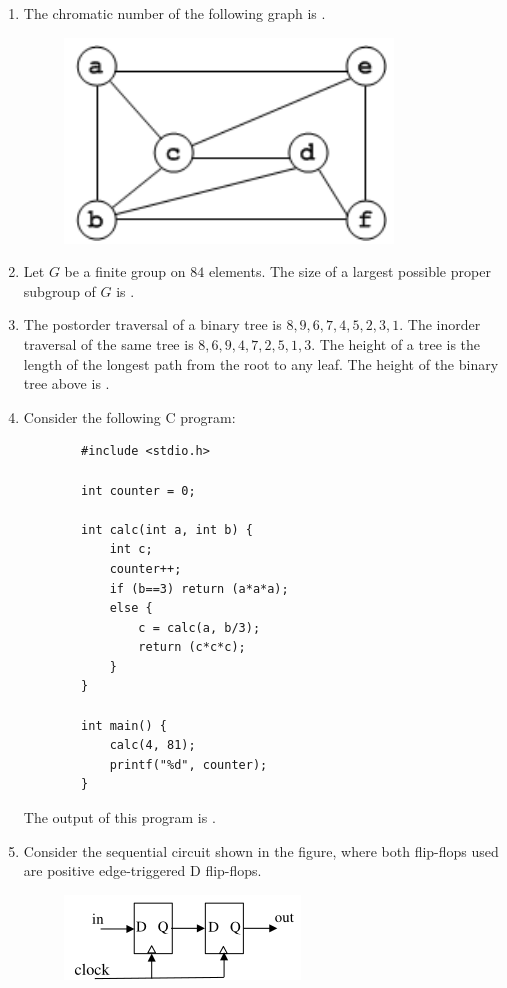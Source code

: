 \documentclass[journal,12pt,onecolumn]{IEEEtran}
\theoremstyle{remark}
\begin{document}
\begin{enumerate}
	\item The chromatic number of the following graph is \underline{\hspace{2cm}}. 
	\hfill{}
	\begin{figure}[H]
		\centering
		\includegraphics[width=0.4\linewidth]{figs/screenshot003}
		\caption{}
		\label{fig:screenshot003}
	\end{figure}
	\item Let $G$ be a finite group on $84$ elements. The size of a largest possible proper subgroup of $G$ is \underline{\hspace{2cm}}.
	
	\hfill{}
	
	\item The postorder traversal of a binary tree is $8,9,6,7,4,5,2,3,1$. The inorder traversal of the same tree is $8,6,9,4,7,2,5,1,3$. The height of a tree is the length of the longest path from the root to any leaf. The height of the binary tree above is \underline{\hspace{2cm}}.
	
	\hfill{}
	
	\item Consider the following C program:
	\begin{verbatim}
		#include <stdio.h>
		
		int counter = 0;
		
		int calc(int a, int b) {
			int c;
			counter++;
			if (b==3) return (a*a*a);
			else {
				c = calc(a, b/3);
				return (c*c*c);
			}
		}
		
		int main() {
			calc(4, 81);
			printf("%d", counter);
		}
	\end{verbatim}
	The output of this program is \underline{\hspace{2cm}}.
	
	\hfill{}
	
	\item Consider the sequential circuit shown in the figure, where both flip-flops used are positive edge-triggered D flip-flops.
\begin{figure}[H]
	\centering
	\includegraphics[width=0.4\linewidth]{figs/screenshot007}
	\caption{}
	\label{fig:screenshot007}
\end{figure}


\end{enumerate}
\end{document}
